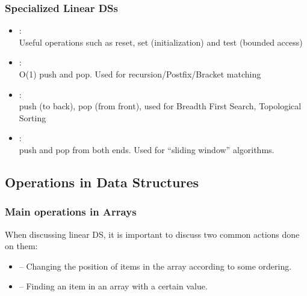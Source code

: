 \documentclass{beamer}
\begin{document}
\begin{frame}
  \frametitle{Specialized Linear DSs}
  \begin{itemize}
  \item {}:\\
    Useful operations such as reset, set (initialization) and test (bounded access)
  \item {}:\\
    O(1) push and pop. Used for recursion/Postfix/Bracket matching
  \item {}:\\
    push (to back), pop (from front), used for Breadth First Search, Topological Sorting
  \item {}:\\
    push and pop from both ends. Used for ``sliding window'' algorithms.
  \end{itemize}
\end{frame}



\subsection{Operations in Data Structures}

\begin{frame}
  \frametitle{Main operations in Arrays}

  When discussing linear DS, it is important to discuss two common
  actions done on them:

  \bigskip

  \begin{itemize}
    \item {} -- Changing the position of items in the
      array according to some ordering.

      \bigskip

    \item {} -- Finding an item in an array with a
      certain value.
  \end{itemize}
\end{frame}
\end{document}
